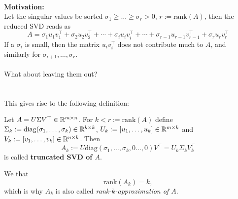 \begin{frame}
~\\
\textbf{\color{header}Motivation:}\\
Let the singular values be sorted $\sigma_1 \geq \ldots \geq \sigma_r > 0$, $r := \text{rank}(A)$, then the reduced SVD reads as 
$$A = \sigma_1 u_1 v_1^\top  +\sigma_2 u_2 v_2^\top  + \cdots+\sigma_i u_i v_i^\top  +\cdots + \sigma_{r-1} u_{r-1} v_{r-1}^\top  + \sigma_{r} u_r v_r^\top    $$
If a $\sigma_i$ is small, then the matrix $u_i v_i^\top $ does not contribute much to $A$, and similarly for $\sigma_{i+1},\ldots, \sigma_r$.\\~\\
What about leaving them out?
~\\~\\~\\
This gives rise to the following definition:\vspace{-0.1cm}
\begin{defi}
	Let $A = U\Sigma V^\top  \in {\mathbb{R}}^{m\times n}$. For $k <r:= \text{rank}(A)$ define $\Sigma_k:=\text{diag}(\sigma_1,\ldots,\sigma_k) \in {\mathbb{R}}^{k \times k}$, $U_k := [u_1,\ldots,u_k]\in {\mathbb{R}}^{m \times k}$ and $V_k:= [v_1,\ldots,v_k]\in {\mathbb{R}}^{n \times k}$. Then $$A_k := U \text{diag}(\sigma_1,\ldots,\sigma_k,0\ldots,0)V^\top  = U_k \Sigma_k V_k^\top $$ is called \textbf{truncated SVD of $A$}.
\end{defi}
We  that $$\text{rank}(A_k) = k,$$ which is why $A_k$ is also called \textit{rank-$k$-approximation of $A$}.\\[5pt]
\end{frame}

